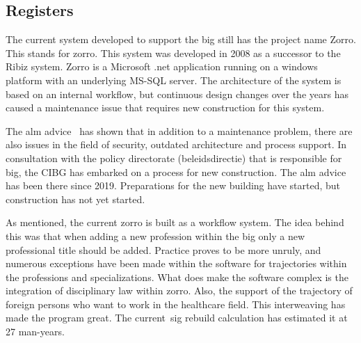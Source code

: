 \subsection{Registers} \label{registers}
The current system developed to support the \acrshort{big} still has the project name Zorro.
This stands for \acrlong{zorro}.
This system was developed in 2008 as a successor to the Ribiz system.
Zorro is a Microsoft .net application running on a windows platform with an underlying MS-SQL server.
The architecture of the system is based on an internal workflow, but continuous design changes over the years
has caused a maintenance issue that requires new construction for this system.

The \acrfull{alm} advice~ has shown that in addition to a maintenance problem, there are also issues in the field of security, outdated architecture and process support.
In consultation with the policy directorate (beleidsdirectie) that is responsible for \acrshort{big}, the CIBG has embarked on a process for new construction.
The \acrshort{alm} advice has been there since 2019.
Preparations for the new building have started, but construction has not yet started.

As mentioned, the current \acrshort{zorro} is built as a workflow system.
The idea behind this was that when adding a new profession within the \acrshort{big} only a new professional title should be added.
Practice proves to be more unruly, and numerous exceptions have been made within the software for trajectories within the professions and specializations.
What does make the software complex is the integration of disciplinary law within \acrshort{zorro}.
Also, the support of the trajectory of foreign persons who want to work in the healthcare field.
This interweaving has made the program great.
The current~\acrfull{sig} rebuild calculation has estimated it at 27 man-years.

